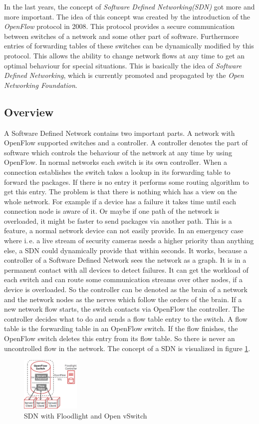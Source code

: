 In the last years, the concept of \textit{Software Defined Networking(SDN)} got more and more important. The idea of this concept was created by the introduction of the \textit{OpenFlow} protocol in 2008\cite{Mc2008}. This protocol provides a secure communication between switches of a network and some other part of software. Furthermore entries of forwarding tables of these switches can be dynamically modified by this protocol. This allows the ability to change network flows at any time to get an optimal behaviour for special situations. This is basically the idea of \textit{Software Defined Networking}, which is currently promoted and propagated by the \textit{Open Networking Foundation}\cite{onf}. 
\subsection{Overview}
A Software Defined Network contains two important parts. A network with OpenFlow supported switches and a controller. A controller denotes the part of software which controls the behaviour of the network at any time by using OpenFlow. In normal networks each switch is its own controller. When a connection establishes the switch takes a lookup in its forwarding table to forward the packages. If there is no entry it performs some routing algorithm to get this entry. The problem is that there is nothing which has a view on the whole network. For example if a device has a failure it takes time until each connection node is aware of it. Or maybe if one path of the network is overloaded, it might be faster to send packages via another path. This is a feature, a normal network device can not easily provide. In an emergency case where i.\,e. a live stream of security cameras needs a higher priority than anything else, a SDN could dynamically provide that within seconds. It works, because a controller of a Software Defined Network sees the network as a graph. It is in a permanent contact with all devices to detect failures. It can get the workload of each switch and can route some communication streams over other nodes, if a device is overloaded. So the controller can be denoted as the brain of a network and the network nodes as the nerves which follow the orders of the brain. If a new network flow starts, the switch contacts via OpenFlow the controller. The controller decides what to do and sends a flow table entry to the switch. A flow table is the forwarding table in an OpenFlow switch. If the flow finishes, the OpenFlow switch deletes this entry from its flow table. So there is never an uncontrolled flow in the network. The concept of a SDN is visualized in figure \ref{sdn}.\\
\begin{figure}[ht]
\centering
\includegraphics[width=0.25\textwidth]{img/sdn} 

\caption{SDN with Floodlight and Open vSwitch}
\label{sdn}
\end{figure}
 

